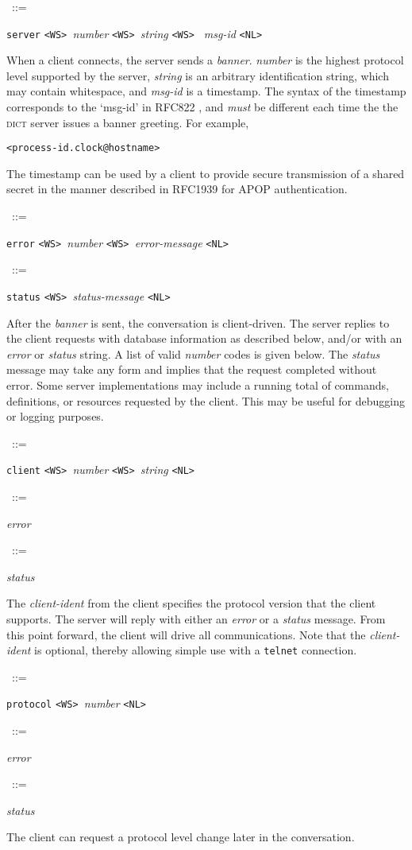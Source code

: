 \documentclass{article}
\newcommand{\WS}{\mbox{\tt <WS>\ }}
\newcommand{\NL}{\mbox{\tt <NL>\ }}
\newcommand{\note}{\bigskip\par\noindent}
\newcommand{\prd}[3][]{\noindent\begin{leftline}\hspace{1em}{\it #2}\ ::=\ %
  \begin{minipage}[t]{.64\textwidth}\raggedright #3\end{minipage}%
    \ifthenelse{\equal{#1}{}}{}%
    {\begin{minipage}[t]{.54\textwidth}\raggedright #1\end{minipage}%
      \vspace{1ex}}%
    \end{leftline}}
\newcommand{\lhs}[1]{{\it #1\/}}
\newcommand{\lit}[1]{{\tt #1}}
\newcommand{\dict}{\textsc{dict}\xspace}
\begin{document}
\prd{banner}{\lit{server} \WS \lhs{number} \WS \lhs{string} \WS
  \lhs{msg-id} \NL}

\note When a client connects, the server sends a \lhs{banner}.  \lhs{number}
is the highest protocol level supported by the server, \lhs{string} is an
arbitrary identification string, which may contain whitespace, and
\lhs{msg-id} is a timestamp.  The syntax of the timestamp corresponds to
the `msg-id' in RFC822 \cite{RFC822}, and \emph{must} be different each
time the the \dict server issues a banner greeting.  For example,
\begin{center}
\begin{verbatim}
<process-id.clock@hostname>
\end{verbatim}
\end{center}
The timestamp can be used by a client to provide secure transmission of a
shared secret in the manner described in RFC1939 \cite{RFC1939} for APOP
authentication.\note

\prd{error}{\lit{error} \WS \lhs{number} \WS \lhs{error-message} \NL}
\prd{status}{\lit{status} \WS \lhs{status-message} \NL}

\note After the \lhs{banner} is sent, the conversation is client-driven.
The server replies to the client requests with database information as
described below, and/or with an \lhs{error} or \lhs{status} string.  A list
of valid \lhs{number} codes is given below.  The \lhs{status} message may
take any form and implies that the request completed without error.  Some
server implementations may include a running total of commands,
definitions, or resources requested by the client.  This may be useful for
debugging or logging purposes.\note

\prd{ident}{\lit{client} \WS \lhs{number} \WS \lhs{string} \NL}
\prd{ident-response}{\lhs{error}}
\prd{ident-response}{\lhs{status}}

\note The \lhs{client-ident} from the client specifies the protocol version
that the client supports.  The server will reply with either an \lhs{error}
or a \lhs{status} message.  From this point forward, the client will drive
all communications.  Note that the \lhs{client-ident} is optional, thereby
allowing simple use with a \texttt{telnet} connection.\note

\prd{protocol}{\lit{protocol} \WS \lhs{number} \NL}
\prd{protocol-response}{\lhs{error}}
\prd{protocol-response}{\lhs{status}}

\note The client can request a protocol level change later in the
conversation.
\end{document}
